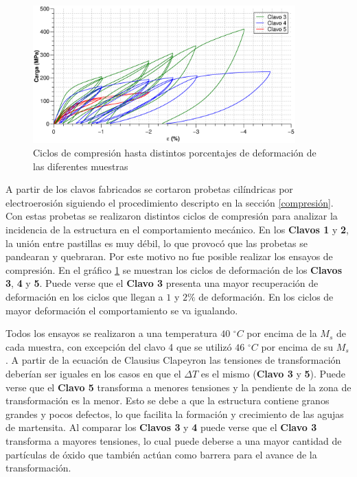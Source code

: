 \documentclass[a4paper,12pt,fleqn,twoside,openany]{book}
\begin{document}
 \begin{figure}[h]
 \centering
 \includegraphics[width=0.9\textwidth]{Img/Resultados/clavos/Clavos_3_4_5.eps}
 \caption{Ciclos de compresión hasta distintos porcentajes de deformación de las diferentes muestras  } 
 \label{fig: Clavos3y4}
 \end{figure}







A partir de los clavos fabricados se cortaron probetas cilíndricas por electroerosión siguiendo el procedimiento descripto en la sección \ref{compresión}. Con estas probetas se realizaron distintos ciclos de compresión para analizar la incidencia de la estructura en el comportamiento mecánico. En los \textbf{Clavos 1} y \textbf{2}, la unión entre pastillas es muy débil, lo que provocó que las probetas se pandearan y quebraran. Por este motivo no fue posible realizar los ensayos de compresión. En el gráfico \ref{fig: Clavos3y4} se muestran los ciclos de deformación de los \textbf{Clavos 3}, \textbf{4} y \textbf{5}. Puede verse que el \textbf{Clavo 3} presenta una mayor recuperación de deformación en los ciclos que llegan a $1$ y $2 \%$ de deformación. En los ciclos de mayor deformación el comportamiento se va igualando.

Todos los ensayos se realizaron a una temperatura $40$ $^\circ C$ por encima de la $M_s$ de cada muestra, con excepción del clavo 4 que se utilizó $46$ $^\circ C$ por encima de su $M_s$. A partir de la ecuación de Clausius Clapeyron las tensiones de transformación deberían ser iguales en los casos en que el $\Delta T$ es el mismo (\textbf{Clavo 3} y \textbf{5}). Puede verse que el \textbf{Clavo 5} transforma a menores tensiones y la pendiente de la zona de transformación es la menor. Esto se debe a que la estructura contiene granos grandes y pocos defectos, lo que facilita la formación y crecimiento de las agujas de martensita. Al comparar los \textbf{Clavos 3} y \textbf{4} puede verse que el \textbf{Clavo 3} transforma a mayores tensiones, lo cual puede deberse a una mayor cantidad de partículas de óxido que también actúan como barrera para el avance de la transformación.  
\end{document}
